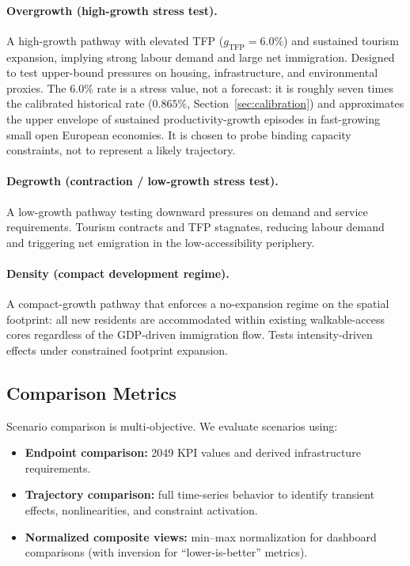 \documentclass[urbansci,article,submit,pdftex,moreauthors]{Definitions/mdpi}
\begin{document}
\paragraph{Overgrowth (high-growth stress test).}
A high-growth pathway with elevated TFP ($g_\text{TFP}=6.0\%$) and sustained
tourism expansion, implying strong labour demand and large net immigration.
Designed to test upper-bound pressures on housing, infrastructure, and
environmental proxies. The $6.0\%$ rate is a stress value, not a forecast: it is
roughly seven times the calibrated historical rate ($0.865\%$,
Section~\ref{sec:calibration}) and approximates the upper envelope of sustained
productivity-growth episodes in fast-growing small open European economies. It is
chosen to probe binding capacity constraints, not to represent a likely
trajectory.

\paragraph{Degrowth (contraction / low-growth stress test).}
A low-growth pathway testing downward pressures on demand and service
requirements. Tourism contracts and TFP stagnates, reducing labour demand and
triggering net emigration in the low-accessibility periphery.

\paragraph{Density (compact development regime).}
A compact-growth pathway that enforces a no-expansion regime on the spatial
footprint: all new residents are accommodated within existing walkable-access
cores regardless of the GDP-driven immigration flow. Tests intensity-driven
effects under constrained footprint expansion.

\subsection{Comparison Metrics}
\label{subsec:exp_metrics}

Scenario comparison is multi-objective. We evaluate scenarios using:
\begin{itemize}
\item \textbf{Endpoint comparison:} 2049 KPI values and derived infrastructure
      requirements.
\item \textbf{Trajectory comparison:} full time-series behavior to identify
      transient effects, nonlinearities, and constraint activation.
\item \textbf{Normalized composite views:} min--max normalization for dashboard
      comparisons (with inversion for ``lower-is-better'' metrics).
\end{itemize}
\end{document}
